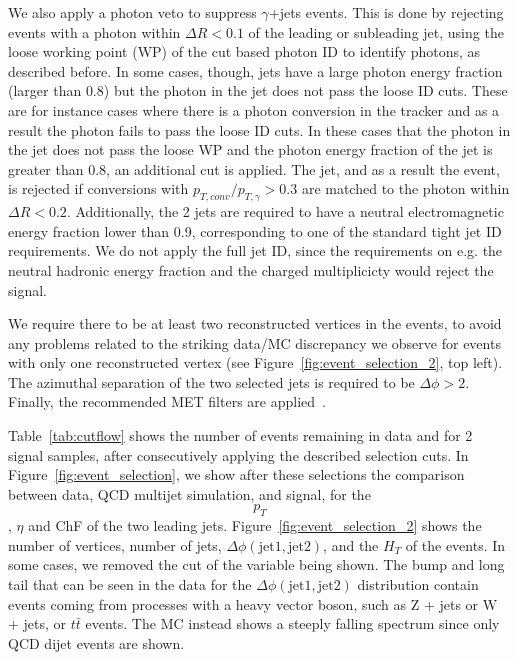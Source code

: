 We also apply a photon veto to suppress $\gamma$+jets events. This is done by rejecting events with a photon within $\Delta R < 0.1$ of the leading or subleading jet, using the loose working point (WP) of the cut based photon ID to identify photons, as described before. In some cases, though, jets have a large photon energy fraction (larger than $0.8$) but the photon in the jet does not pass the loose ID cuts. These are for instance cases where there is a photon conversion in the tracker and as a result the photon fails to pass the loose ID cuts. In these cases that the photon in the jet does not pass the loose WP and the photon energy fraction of the jet is greater than $0.8$, an additional cut is applied. The jet, and as a result the event, is rejected if conversions with $p_{T,conv} / p_{T,\gamma} > 0.3$ are matched to the photon within $\Delta R < 0.2$. Additionally, the 2 jets are required to have a neutral electromagnetic energy fraction lower than 0.9, corresponding to one of the standard tight jet ID requirements. We do not apply the full jet ID, since the requirements on e.g. the neutral hadronic energy fraction and the charged multiplicicty would reject the signal.

We require there to be at least two reconstructed vertices in the events, to avoid any problems related to the striking data/MC discrepancy we observe for events with only one reconstructed vertex (see  Figure~\ref{fig:event_selection_2}, top left). The azimuthal separation of the two selected jets is required to be $\Delta\phi > 2$. Finally, the recommended MET filters are applied~\cite{filters}.

Table~\ref{tab:cutflow} shows the number of events remaining in data and for 2 signal samples, after consecutively applying the described selection cuts. In Figure~\ref{fig:event_selection}, we show after these selections the comparison between data, QCD multijet simulation, and signal, for the $$p_T$$, $\eta$ and ChF of the two leading jets. Figure~\ref{fig:event_selection_2} shows the number of vertices, number of jets, $\Delta\phi(\mathrm{jet}1, \mathrm{jet}2)$, and the $H_{T}$ of the events. In some cases, we removed the cut of the variable being shown. The bump and long tail that can be seen in the data for the $\Delta\phi(\mathrm{jet}1, \mathrm{jet}2)$ distribution contain events coming from processes with a heavy vector boson, such as Z + jets or W + jets, or $t\bar{t}$ events. The MC instead shows a steeply falling spectrum since only QCD dijet events are shown.

